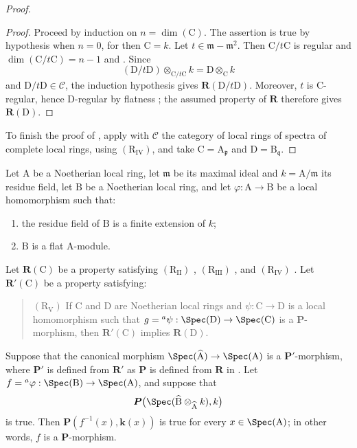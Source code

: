 \begin{proof}
\begin{proof}
Proceed by induction on $n=\dim(\mathrm{C})$. The assertion is true by hypothesis when $n=0$, for then $\mathrm{C}=k$. Let $t\in\mathfrak{m}-\mathfrak{m}^2$. Then $\mathrm{C}/t\mathrm{C}$ is regular and $\dim(\mathrm{C}/t\mathrm{C})=n-1$  and . Since
\[
  (\mathrm{D}/t\mathrm{D})\otimes_{\mathrm{C}/t\mathrm{C}}k
  =\mathrm{D}\otimes_\mathrm{C}k
\]
and $\mathrm{D}/t\mathrm{D}\in\mathcal{C}$, the induction hypothesis gives $\boldsymbol{R}(\mathrm{D}/t\mathrm{D})$. Moreover, $t$ is $\mathrm{C}$-regular, hence $\mathrm{D}$-regular by flatness ; the assumed property of $\boldsymbol{R}$ therefore gives $\boldsymbol{R}(\mathrm{D})$.
\end{proof}

To finish the proof of , apply  with $\mathcal{C}$ the category of local rings of spectra of complete local rings, using $(\mathrm{R}_{\mathrm{IV}})$, and take $\mathrm{C}=\mathrm{A}_\mathfrak{p}$ and $\mathrm{D}=\mathrm{B}_\mathfrak{q}$.
\end{proof}

\begin{corollary}[7.5.2]
\label{IV.7.5.2}
Let $\mathrm{A}$ be a Noetherian local ring, let $\mathfrak{m}$ be its maximal ideal and $k=\mathrm{A}/\mathfrak{m}$ its residue field, let $\mathrm{B}$ be a Noetherian local ring, and let $\varphi:\mathrm{A}\to\mathrm{B}$ be a local homomorphism such that:
\begin{enumerate}[label=(\roman*)]
  \item the residue field of $\mathrm{B}$ is a finite extension of $k$;
  \item $\mathrm{B}$ is a flat $\mathrm{A}$-module.
\end{enumerate}
Let $\boldsymbol{R}(\mathrm{C})$ be a property satisfying $(\mathrm{R}_{\mathrm{II}})$ , $(\mathrm{R}_{\mathrm{III}})$ , and $(\mathrm{R}_{\mathrm{IV}})$ . Let $\boldsymbol{R}'(\mathrm{C})$ be a property satisfying:
\begin{quote}
$(\mathrm{R}_{\mathrm{V}})$ If $\mathrm{C}$ and $\mathrm{D}$ are Noetherian local rings and $\psi:\mathrm{C}\to\mathrm{D}$ is a local homomorphism such that $g={}^a\psi:\Spec(\mathrm{D})\to\Spec(\mathrm{C})$ is a $\boldsymbol{P}$-morphism, then $\boldsymbol{R}'(\mathrm{C})$ implies $\boldsymbol{R}(\mathrm{D})$.
\end{quote}
Suppose that the canonical morphism $\Spec(\widehat{\mathrm{A}})\to\Spec(\mathrm{A})$ is a $\boldsymbol{P}'$-morphism, where $\boldsymbol{P}'$ is defined from $\boldsymbol{R}'$ as $\boldsymbol{P}$ is defined from $\boldsymbol{R}$ in . Let $f={}^a\varphi:\Spec(\mathrm{B})\to\Spec(\mathrm{A})$, and suppose that
\[
  \boldsymbol{P}\bigl(\Spec(\widehat{\mathrm{B}}\otimes_{\widehat{\mathrm{A}}}k),k\bigr)
\]
is true. Then $\boldsymbol{P}(f^{-1}(x),\boldsymbol{k}(x))$ is true for every $x\in\Spec(\mathrm{A})$; in other words, $f$ is a $\boldsymbol{P}$-morphism.
\end{corollary}

